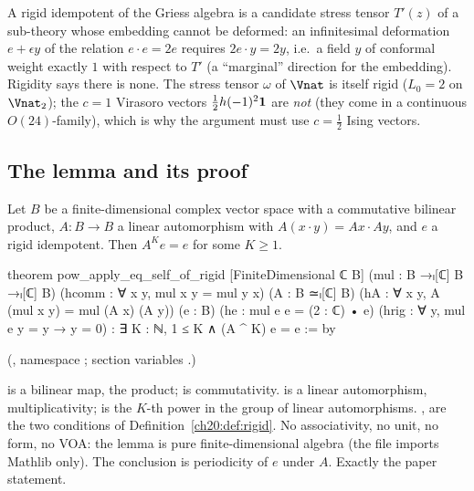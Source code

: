 \begin{physics}
A rigid idempotent of the Griess algebra is a candidate stress tensor $T'(z)$ of a sub-theory whose embedding cannot be
deformed: an infinitesimal deformation $e+\epsilon y$ of the relation $e\cdot e=2e$ requires $2e\cdot y=2y$, i.e.\ a field
$y$ of conformal weight exactly $1$ with respect to $T'$ (a ``marginal'' direction for the embedding).  Rigidity says there
is none.  The stress tensor $\omega$ of $\Vnat$ is itself rigid ($L_0=2$ on $\Vnat_2$); the $c=1$ Virasoro vectors
$\tfrac12h(-1)^2\mathbf 1$ are \emph{not} (they come in a continuous $O(24)$-family), which is why the argument must
use $c=\tfrac12$ Ising vectors.
\end{physics}

\subsection{The lemma and its proof}

\begin{theorem}\label{ch20:thm:periodic}
Let $B$ be a finite-dimensional complex vector space with a commutative bilinear product, $A:B\to B$ a linear
automorphism with $A(x\cdot y)=Ax\cdot Ay$, and $e$ a rigid idempotent.  Then $A^Ke=e$ for some $K\ge1$.
\end{theorem}
\begin{leancode}
theorem pow_apply_eq_self_of_rigid [FiniteDimensional ℂ B]
    (mul : B →ₗ[ℂ] B →ₗ[ℂ] B) (hcomm : ∀ x y, mul x y = mul y x)
    (A : B ≃ₗ[ℂ] B) (hA : ∀ x y, A (mul x y) = mul (A x) (A y))
    (e : B) (he : mul e e = (2 : ℂ) • e)
    (hrig : ∀ y, mul e y = y → y = 0) :
    ∃ K : ℕ, 1 ≤ K ∧ (A ^ K) e = e := by
\end{leancode}
(, namespace ; section
variables .)
\begin{dictionary}
 is a bilinear map, the product;  is commutativity.   is a linear
automorphism,  multiplicativity;  is the $K$-th power in the group of linear automorphisms.
,  are the two conditions of Definition~\ref{ch20:def:rigid}.  No associativity, no unit, no
form, no VOA: the lemma is pure finite-dimensional algebra (the file imports Mathlib only).  The conclusion
 is periodicity of $e$ under $A$.  Exactly the paper statement.
\end{dictionary}

